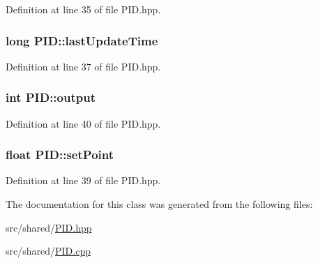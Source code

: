 Definition at line 35 of file P\-I\-D.\-hpp.

\hypertarget{classPID_ac544c553fc46b395600413117df8a1f8}{
\subsubsection[{last\-Update\-Time}]{\setlength{\rightskip}{0pt plus 5cm}long P\-I\-D\-::last\-Update\-Time}}\label{classPID_ac544c553fc46b395600413117df8a1f8}


Definition at line 37 of file P\-I\-D.\-hpp.

\hypertarget{classPID_a34f2887b625d8d49e546b4e2fb389d04}{
\subsubsection[{output}]{\setlength{\rightskip}{0pt plus 5cm}int P\-I\-D\-::output}}\label{classPID_a34f2887b625d8d49e546b4e2fb389d04}


Definition at line 40 of file P\-I\-D.\-hpp.

\hypertarget{classPID_aab66dffb3291ee486568e8b73cb71831}{
\subsubsection[{set\-Point}]{\setlength{\rightskip}{0pt plus 5cm}float P\-I\-D\-::set\-Point}}\label{classPID_aab66dffb3291ee486568e8b73cb71831}


Definition at line 39 of file P\-I\-D.\-hpp.



The documentation for this class was generated from the following files\-:\begin{DoxyCompactItemize}
\item 
src/shared/\hyperlink{PID_8hpp}{P\-I\-D.\-hpp}\item 
src/shared/\hyperlink{PID_8cpp}{P\-I\-D.\-cpp}\end{DoxyCompactItemize}
